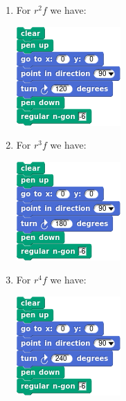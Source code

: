 \documentclass[noauthor,nooutcomes,hints,handout]{ximera}
\begin{document}
\begin{question}
\begin{freeResponse}
\begin{enumerate}
\begin{center}
      \end{center}
    \item For $r^2f$ we have:
      \begin{center}
        \includegraphics[width=.3\textwidth]{r2fHexSCRIPT.png}   \qquad {}
      \end{center}
    \item For $r^3f$ we have:
      \begin{center}
        \includegraphics[width=.3\textwidth]{r3fHexSCRIPT.png}   \qquad {}
      \end{center}
    \item For $r^4f$ we have:
      \begin{center}
        \includegraphics[width=.3\textwidth]{r4fHexSCRIPT.png}   \qquad {}

\end{center}
\end{enumerate}
\end{freeResponse}
\end{question}
\end{document}
